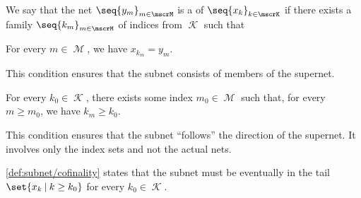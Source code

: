 \begin{definition}\label{def:subnet}
  We say that the net \( \seq{ y_m }_{m \in \mscrM} \) is a  of \( \seq{ x_k }_{k \in \mscrK} \) if there exists a family \( \seq{ k_m }_{m \in \mscrM} \) of indices from \( \mscrK \) such that
  \begin{thmenum}
     For every \( m \in \mscrM \), we have \( x_{k_m} = y_m \).

    This condition ensures that the subnet consists of members of the supernet.

     For every \( k_0 \in \mscrK \), there exists some index \( m_0 \in \mscrM \) such that, for every \( m \geq m_0 \), we have \( k_m \geq k_0 \).

    This condition ensures that the subnet \enquote{follows} the direction of the supernet. It involves only the index sets and not the actual nets.
  \end{thmenum}
\end{definition}
\begin{comments}
  \item \ref{def:subnet/cofinality} states that the subnet must be eventually in the tail \( \set{ x_k \given k \geq k_0 } \) for every \( k_0 \in \mscrK \).
\end{comments}

